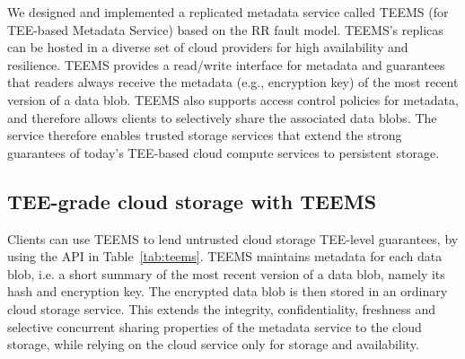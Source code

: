 
We designed and implemented a replicated metadata service called
\ac{TEEMS} (for \ac{TEE}-based Metadata Service) based on the
\ac{RR} fault model. \ac{TEEMS}'s replicas can be hosted in a
diverse set of cloud providers for high availability and
resilience.
%
\ac{TEEMS} provides a read/write interface for metadata and guarantees that
readers always receive the metadata (e.g., encryption key) of the most
recent version of a data blob.  \ac{TEEMS} also supports access control
policies for metadata, and therefore allows clients to selectively
share the associated data blobs.  The service therefore enables
trusted storage services that extend the strong guarantees of today's
\ac{TEE}-based cloud compute services to persistent storage.

\subsection{\ac{TEE}-grade cloud storage with \ac{TEEMS}}

Clients can use \ac{TEEMS} to lend untrusted cloud storage \ac{TEE}-level
guarantees, by using the API in Table~\ref{tab:teems}.
\ac{TEEMS} maintains metadata for each data blob, i.e. a short summary of
the most recent version of a data blob, namely its hash and encryption
key. The encrypted data blob is then stored in an ordinary cloud
storage service. This extends the integrity, confidentiality,
freshness and selective concurrent sharing properties of the
metadata service to the cloud storage, while relying on the cloud
service only for storage and availability.

